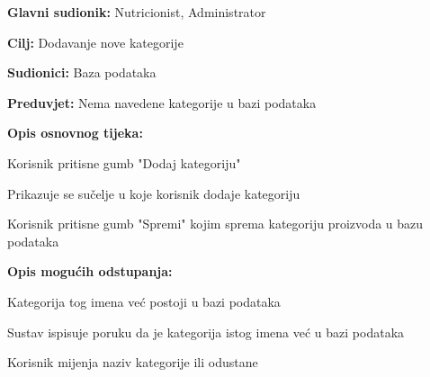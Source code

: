                     \noindent {}
                    \begin{packed_item}
    
                        \item \textbf{Glavni sudionik: }Nutricionist, Administrator
                        \item  \textbf{Cilj:} Dodavanje nove kategorije
                        \item  \textbf{Sudionici:} Baza podataka
                        \item  \textbf{Preduvjet:} Nema navedene kategorije u bazi podataka
                        \item  \textbf{Opis osnovnog tijeka:} 
                        
                        \item[] \begin{packed_enum}
    
                            \item Korisnik pritisne gumb "Dodaj kategoriju"
                            \item Prikazuje se sučelje u koje korisnik dodaje kategoriju
                            \item Korisnik pritisne gumb "Spremi" kojim sprema kategoriju proizvoda u bazu podataka
                        \end{packed_enum}
                        
                        \item  \textbf{Opis mogućih odstupanja:}
                        
                        \item[] \begin{packed_item}
    
                            \item[2.a] Kategorija tog imena već postoji u bazi podataka
                            \item[] \begin{packed_enum}
                                
                                \item Sustav ispisuje poruku da je kategorija istog imena već u bazi podataka
                                \item Korisnik mijenja naziv kategorije ili odustane
                                

\end{packed_enum}
\end{packed_item}
\end{packed_item}
